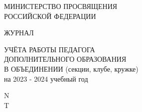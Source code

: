 

\thispagestyle{empty}
\begin{center}

 {\huge МИНИСТЕРСТВО ПРОСВЯЩЕНИЯ }
\\
{\huge  РОССИЙСКОЙ ФЕДЕРАЦИИ }

\vspace{50mm} %
{\huge  ЖУРНАЛ }
\vspace{30mm} %

{\huge УЧЁТА РАБОТЫ ПЕДАГОГА }
\\
\vspace{2mm} %
{\huge ДОПОЛНИТЕЛЬНОГО ОБРАЗОВАНИЯ }
\\
\vspace{2mm} %
{\huge  В ОБЪЕДИНЕНИИ (секции, клубе, кружке) }
\\
\vspace{2mm} %
{\huge  на 2023 - 2024 учебный год }

\vspace{50mm} %
{\huge N }
\\
\vspace{2mm} %
{\huge T }

\end{center}

\clearpage
\restoregeometry